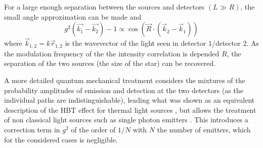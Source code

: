 For a large enough separation between the sources and detectors $(L \gg R)$, the small angle approximation can be made and
\begin{equation}
	g^2\left(\vec{k_1}-\vec{k_2}\right)-1\propto \cos{\left(\vec{R} \cdot\left(\vec{k}_{2}-\vec{k}_{1}\right)\right)}
\end{equation} 
where $\vec{k}_{1,2}=k \vec{r}_{1,2}$ is the wavevector of the light seen in detector $1$/detector $2$. As the modulation frequency of the the intensity correlation is depended $R$, the separation of the two sources (the size of the star) can be recovered.

A more detailed quantum mechanical treatment considers the mixtures of the probability amplitudes of emission and detection at the two detectors (as the individual paths are indistinguishable), leading what was shown as an equivalent description of the HBT effect for thermal light sources \cite{fano1961,sudarshan1963,glauber2006}, but allows the treatment of non classical light sources such as single photon emitters \cite{mandel1995,classen2017}. This introduces a correction term in $g^2$ of the order of $1/N$ with $N$ the number of emitters, which for the considered cases is negligible.



